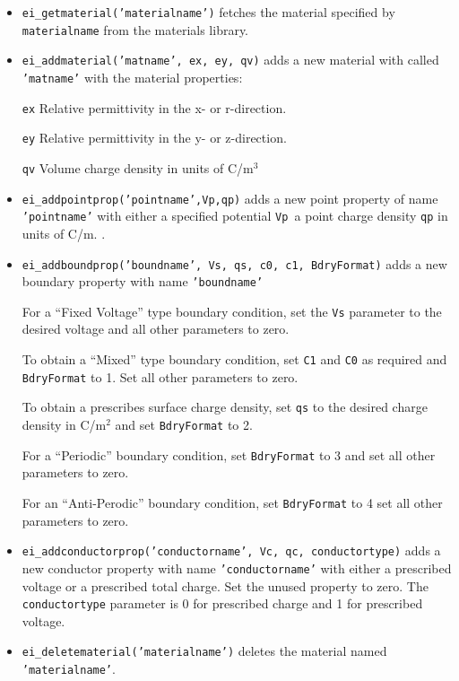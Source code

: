 \begin{itemize}
\item \texttt{ei\_getmaterial('materialname')} fetches the material specified by \texttt{materialname} 
from the materials library.

\item {\tt ei\_addmaterial('matname', ex, ey, qv)} adds a new material with
called {\tt 'matname'} with the material properties:

\texttt{ex} Relative permittivity in the x- or r-direction.

\texttt{ey} Relative permittivity in the y- or z-direction.

\texttt{qv} Volume charge density in units of C/m$^{3}$

\item \texttt{ei\_addpointprop('pointname',Vp,qp)} adds a new point property of
name \texttt{'pointname'} with either a specified potential
\texttt{Vp }a point charge density \texttt{qp} in units of C/m. .

\item \texttt{ei\_addboundprop('boundname', Vs, qs, c0, c1, BdryFormat)} adds a
new boundary property with name \texttt{'boundname'}

For a ``Fixed Voltage'' type boundary condition, set the
\texttt{Vs} parameter to the desired voltage and all other
parameters to zero.

To obtain a ``Mixed'' type boundary condition, set \texttt{C1} and
\texttt{C0} as required and \texttt{BdryFormat} to 1. Set all other
parameters to zero.

To obtain a prescribes surface charge density, set \texttt{qs} to
the desired charge density in C/m$^{2}$ and set \texttt{BdryFormat}
to 2.

For a ``Periodic'' boundary condition, set \texttt{BdryFormat} to 3
and set all other parameters to zero.

For an ``Anti-Perodic'' boundary condition, set \texttt{BdryFormat}
to 4 set all other parameters to zero.

\item \texttt{ei\_addconductorprop('conductorname', Vc, qc, conductortype)} adds a new
conductor property with name \texttt{'conductorname'} with either a
prescribed voltage or a prescribed total charge. Set the unused
property to zero. The \texttt{conductortype} parameter is 0 for
prescribed charge and 1 for prescribed voltage.

\item \texttt{ei\_deletematerial('materialname')} deletes the material named
\texttt{'materialname'}.


\end{itemize}
